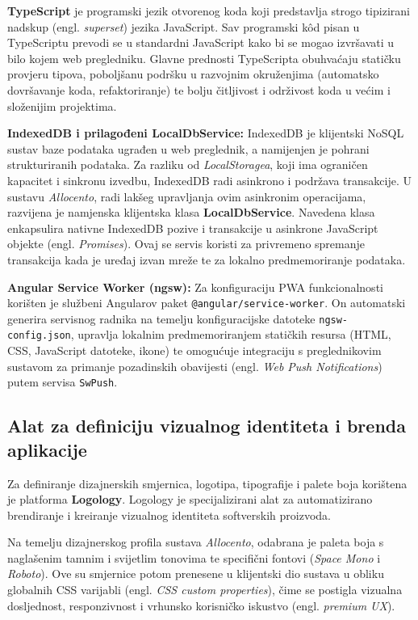 \documentclass[a4paper,12pt,oneside]{article}
\begin{document}
	\textbf{TypeScript} je programski jezik otvorenog koda koji predstavlja strogo tipizirani nadskup (engl. \textit{superset}) jezika JavaScript. Sav programski kôd pisan u TypeScriptu prevodi se u standardni JavaScript kako bi se mogao izvršavati u bilo kojem web pregledniku. Glavne prednosti TypeScripta obuhvaćaju statičku provjeru tipova, poboljšanu podršku u razvojnim okruženjima (automatsko dovršavanje koda, refaktoriranje) te bolju čitljivost i održivost koda u većim i složenijim projektima.
	
	\textbf{IndexedDB i prilagođeni LocalDbService:} IndexedDB je klijentski NoSQL sustav baze podataka ugrađen u web preglednik, a namijenjen je pohrani strukturiranih podataka. Za razliku od \textit{LocalStoragea}, koji ima ograničen kapacitet i sinkronu izvedbu, IndexedDB radi asinkrono i podržava transakcije. U sustavu \textit{Allocento}, radi lakšeg upravljanja ovim asinkronim operacijama, razvijena je namjenska klijentska klasa \textbf{LocalDbService}. Navedena klasa enkapsulira nativne IndexedDB pozive i transakcije u asinkrone JavaScript objekte (engl. \textit{Promises}). Ovaj se servis koristi za privremeno spremanje transakcija kada je uređaj izvan mreže te za lokalno predmemoriranje podataka.
	
	\textbf{Angular Service Worker (ngsw):} Za konfiguraciju PWA funkcionalnosti korišten je službeni Angularov paket \texttt{@angular/service-worker}. On automatski generira servisnog radnika na temelju konfiguracijske datoteke \texttt{ngsw-config.json}, upravlja lokalnim predmemoriranjem statičkih resursa (HTML, CSS, JavaScript datoteke, ikone) te omogućuje integraciju s preglednikovim sustavom za primanje pozadinskih obavijesti (engl. \textit{Web Push Notifications}) putem servisa \texttt{SwPush}.

	\subsection{Alat za definiciju vizualnog identiteta i brenda aplikacije}
	
	Za definiranje dizajnerskih smjernica, logotipa, tipografije i palete boja korištena je platforma \textbf{Logology}. Logology je specijalizirani alat za automatizirano brendiranje i kreiranje vizualnog identiteta softverskih proizvoda. 
	
	Na temelju dizajnerskog profila sustava \textit{Allocento}, odabrana je paleta boja s naglašenim tamnim i svijetlim tonovima te specifični fontovi (\textit{Space Mono} i \textit{Roboto}). Ove su smjernice potom prenesene u klijentski dio sustava u obliku globalnih CSS varijabli (engl. \textit{CSS custom properties}), čime se postigla vizualna dosljednost, responzivnost i vrhunsko korisničko iskustvo (engl. \textit{premium UX}).
\end{document}
